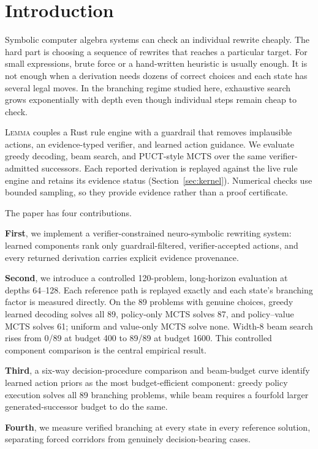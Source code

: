 \documentclass[11pt]{article}
\numberwithin{equation}{section}
\newcommand{\lemma}{\textsc{Lemma}}
\begin{document}
\section{Introduction}

Symbolic computer algebra systems can check an individual rewrite cheaply. The hard part is choosing a sequence of rewrites that reaches a particular target. For small expressions, brute force or a hand-written heuristic is usually enough. It is not enough when a derivation needs dozens of correct choices and each state has several legal moves. In the branching regime studied here, exhaustive search grows exponentially with depth even though individual steps remain cheap to check.

\lemma{} couples a Rust rule engine with a guardrail that removes implausible actions, an evidence-typed verifier, and learned action guidance. We evaluate greedy decoding, beam search, and PUCT-style MCTS over the same verifier-admitted successors. Each reported derivation is replayed against the live rule engine and retains its evidence status (Section~\ref{sec:kernel}). Numerical checks use bounded sampling, so they provide evidence rather than a proof certificate.

The paper has four contributions.

\textbf{First}, we implement a verifier-constrained neuro-symbolic rewriting system: learned components rank only guardrail-filtered, verifier-accepted actions, and every returned derivation carries explicit evidence provenance.

\textbf{Second}, we introduce a controlled 120-problem, long-horizon evaluation at depths 64--128. Each reference path is replayed exactly and each state's branching factor is measured directly. On the 89 problems with genuine choices, greedy learned decoding solves all 89, policy-only MCTS solves 87, and policy--value MCTS solves 61; uniform and value-only MCTS solve none. Width-8 beam search rises from 0/89 at budget 400 to 89/89 at budget 1600. This controlled component comparison is the central empirical result.

\textbf{Third}, a six-way decision-procedure comparison and beam-budget curve identify learned action priors as the most budget-efficient component: greedy policy execution solves all 89 branching problems, while beam requires a fourfold larger generated-successor budget to do the same.

\textbf{Fourth}, we measure verified branching at every state in every reference solution, separating forced corridors from genuinely decision-bearing cases.
\end{document}
